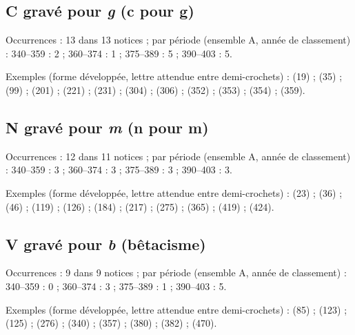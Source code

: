 \subsection*{C gravé pour \textit{g} (c pour g)}
\noindent Occurrences : 13 dans 13 notices ; par période (ensemble A, année de classement) : 340–359 : 2 ; 360–374 : 1 ; 375–389 : 5 ; 390–403 : 5.\par
\noindent Exemples (forme développée, lettre attendue entre demi-crochets) :  (19) ;  (35) ;  (99) ;  (201) ;  (221) ;  (231) ;  (304) ;  (306) ;  (352) ;  (353) ;  (354) ;  (359).\par
{}\par\medskip
\subsection*{N gravé pour \textit{m} (n pour m)}
\noindent Occurrences : 12 dans 11 notices ; par période (ensemble A, année de classement) : 340–359 : 3 ; 360–374 : 3 ; 375–389 : 3 ; 390–403 : 3.\par
\noindent Exemples (forme développée, lettre attendue entre demi-crochets) :  (23) ;  (36) ;  (46) ;  (119) ;  (126) ;  (184) ;  (217) ;  (275) ;  (365) ;  (419) ;  (424).\par
{}\par\medskip
\subsection*{V gravé pour \textit{b} (bêtacisme)}
\noindent Occurrences : 9 dans 9 notices ; par période (ensemble A, année de classement) : 340–359 : 0 ; 360–374 : 3 ; 375–389 : 1 ; 390–403 : 5.\par
\noindent Exemples (forme développée, lettre attendue entre demi-crochets) :  (85) ;  (123) ;  (125) ;  (276) ;  (340) ;  (357) ;  (380) ;  (382) ;  (470).\par
{}\par\medskip
